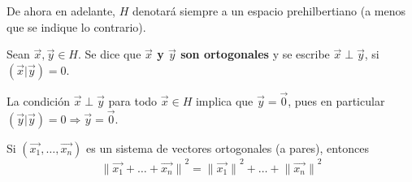 \documentclass[12pt]{report}
\newcounter{it}
\theoremstyle{largebreak}
\newcommand\norm[1]{\ensuremath{\|#1\|}}
\newcommand\pint[2]{\ensuremath{\left(#1\big| #2\right)}}
\begin{document}
    De ahora en adelante, $H$ denotará siempre a un espacio prehilbertiano (a menos que se indique lo contrario).

    \begin{mydef}
        Sean $\vec{x},\vec{y}\in H$. Se dice que \textbf{$\vec{x}$ y $\vec{y}$ son ortogonales} y se escribe $\vec{x}\perp\vec{y}$, si $\pint{\vec{x}}{\vec{y}}=0$.
    \end{mydef}

    \begin{obs}
        La condición $\vec{x}\perp\vec{y}$ para todo $\vec{x}\in H$ implica que $\vec{y}=\vec{0}$, pues en particular $\pint{\vec{y}}{\vec{y}}=0\Rightarrow\vec{y}=\vec{0}$.
    \end{obs}

    \begin{theor}
        Si $\left(\vec{x_1},\dots,\vec{x_n} \right)$ es un sistema de vectores ortogonales (a pares), entonces
        \begin{equation*}
            \norm{\vec{x_1}+\dots+\vec{x_n}}^2=\norm{\vec{x_1}}^2+\dots+\norm{\vec{x_n}}^2
        \end{equation*}
    \end{theor}
\end{document}
